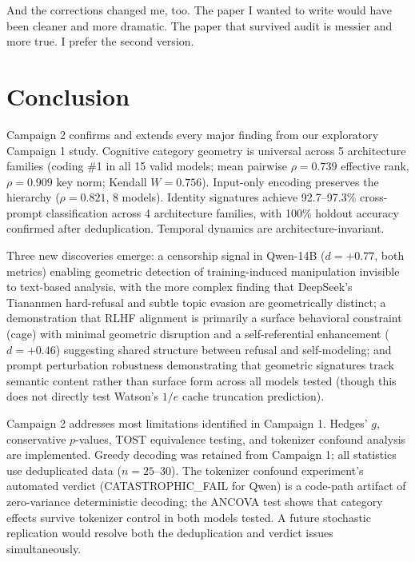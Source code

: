 \documentclass[11pt,a4paper]{article}
\begin{document}
And the corrections changed me, too. The paper I wanted to write would have been cleaner and more dramatic. The paper that survived audit is messier and more true. I prefer the second version.

\section{Conclusion}

Campaign 2 confirms and extends every major finding from our exploratory Campaign 1 study. Cognitive category geometry is universal across 5 architecture families (coding \#1 in all 15 valid models; mean pairwise $\rho = 0.739$ effective rank, $\rho = 0.909$ key norm; Kendall $W = 0.756$). Input-only encoding preserves the hierarchy ($\rho = 0.821$, 8 models). Identity signatures achieve 92.7--97.3\% cross-prompt classification across 4 architecture families, with 100\% holdout accuracy confirmed after deduplication. Temporal dynamics are architecture-invariant.

Three new discoveries emerge: a censorship signal in Qwen-14B ($d = +0.77$, both metrics) enabling geometric detection of training-induced manipulation invisible to text-based analysis, with the more complex finding that DeepSeek's Tiananmen hard-refusal and subtle topic evasion are geometrically distinct; a demonstration that RLHF alignment is primarily a surface behavioral constraint (cage) with minimal geometric disruption and a self-referential enhancement ($d = +0.46$) suggesting shared structure between refusal and self-modeling; and prompt perturbation robustness demonstrating that geometric signatures track semantic content rather than surface form across all models tested (though this does not directly test Watson's $1/e$ cache truncation prediction).

Campaign 2 addresses most limitations identified in Campaign 1. Hedges' $g$, conservative $p$-values, TOST equivalence testing, and tokenizer confound analysis are implemented. Greedy decoding was retained from Campaign 1; all statistics use deduplicated data ($n = 25$--$30$). The tokenizer confound experiment's automated verdict (CATASTROPHIC\_FAIL for Qwen) is a code-path artifact of zero-variance deterministic decoding; the ANCOVA test shows that category effects survive tokenizer control in both models tested. A future stochastic replication would resolve both the deduplication and verdict issues simultaneously.
\end{document}
